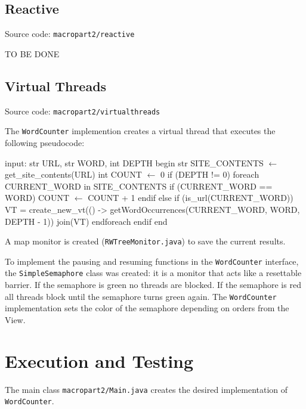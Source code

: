 \documentclass[12pt, a4paper]{report}
\begin{document}
\subsection{Reactive}
Source code: \texttt{macropart2/reactive}

TO BE DONE
\subsection{Virtual Threads}
Source code: \texttt{macropart2/virtualthreads}

The \texttt{WordCounter} implemention creates a virtual thread that executes the following pseudocode:

\newpage

\begin{algorithm}[label={alg5}]
input: str URL, str WORD, int DEPTH
begin
    str SITE_CONTENTS $\gets$ get_site_contents(URL)
    int COUNT $\gets$ 0
    if (DEPTH != 0)
        foreach CURRENT_WORD in SITE_CONTENTS
            if (CURRENT_WORD == WORD)
                COUNT $\gets$ COUNT + 1
            endif
            else if (is_url(CURRENT_WORD))
                VT = create_new_vt(() -> 
                    getWordOccurrences(CURRENT_WORD, WORD, DEPTH - 1))
                join(VT)
        endforeach
    endif
end       
\end{algorithm}

A map monitor is created (\texttt{RWTreeMonitor.java}) to save the current results.

To implement the pausing and resuming functions in the
 \texttt{WordCounter} interface, the \texttt{SimpleSemaphore} class was created: it is a monitor that acts like a resettable barrier. If the
 semaphore is green no threads are blocked. If the semaphore is red all threads block until the semaphore turns green again. The \texttt{WordCounter}
 implementation sets the color of the semaphore depending on orders from the View.

\section{Execution and Testing}
The main class \texttt{macropart2/Main.java} creates the desired implementation of \texttt{WordCounter}.


\end{document}
